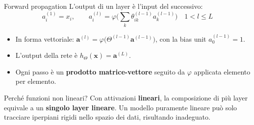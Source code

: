 \documentclass[aspectratio=169]{beamer}
\begin{document}
\begin{frame}{Forward propagation}
  L'output di un layer è l'input del successivo:
  \[ a_i^{(1)} = x_i, \qquad
     a_i^{(l)} = \varphi\Big( \sum_k \theta_{ik}^{(l-1)} a_k^{(l-1)} \Big)
     \quad 1 < l \le L \]
  \vspace{-0.2cm}
  \begin{itemize}
    \item In forma vettoriale: $\mathbf{a}^{(l)} = \varphi\big(\Theta^{(l-1)}
          \mathbf{a}^{(l-1)}\big)$, con la bias unit $a_0^{(l-1)}=1$.
    \item L'output della rete è $h_\Theta(\mathbf{x}) = \mathbf{a}^{(L)}$.
    \item Ogni passo è un \textbf{prodotto matrice-vettore} seguito da
          $\varphi$ applicata elemento per elemento.
  \end{itemize}
   \begin{block}{Perché funzioni non lineari?}
    Con attivazioni \textbf{lineari}, la composizione di più layer equivale a un \textbf{singolo layer lineare}. Un modello puramente lineare può solo tracciare iperpiani rigidi nello spazio dei dati, risultando inadeguato.
  \end{block}
\end{frame}
\end{document}
